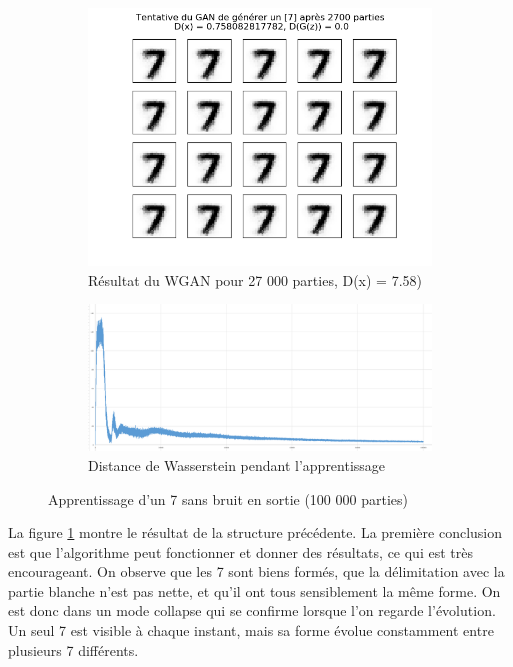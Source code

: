  	\begin{figure}[ht!]
  \centering
  	\begin{subfigure}[b]{.3\linewidth}
    \includegraphics[width=\linewidth]{fig/Wgan_result_1}
    \caption{Résultat du WGAN pour 27 000 parties, D(x) = 7.58)}
    \label{fig:Wgan_result_1_nombres}
\end{subfigure}
\quad
\begin{subfigure}[b]{.6\linewidth}
  \centering
    \includegraphics[width=10cm]{fig/Wgan_result_1_courbe}
    \caption{Distance de Wasserstein pendant l'apprentissage}
    \label{fig:Wgan_result_1_courbe}
    \end{subfigure}
    \caption{Apprentissage d'un 7 sans bruit en sortie (100 000 parties)}
    \label{fig:Wgan_result_1}
\end{figure}
	La figure \ref{fig:Wgan_result_1_nombres} montre le résultat de la structure précédente. La première conclusion est que l'algorithme peut fonctionner et donner des résultats, ce qui est très encourageant. On observe que les 7 sont biens formés, que la délimitation avec la partie blanche n'est pas nette, et qu'il ont tous sensiblement la même forme. On est donc dans un mode collapse qui se confirme lorsque l'on regarde l'évolution. Un seul 7 est visible à chaque instant, mais sa forme évolue constamment entre plusieurs 7 différents.\\
